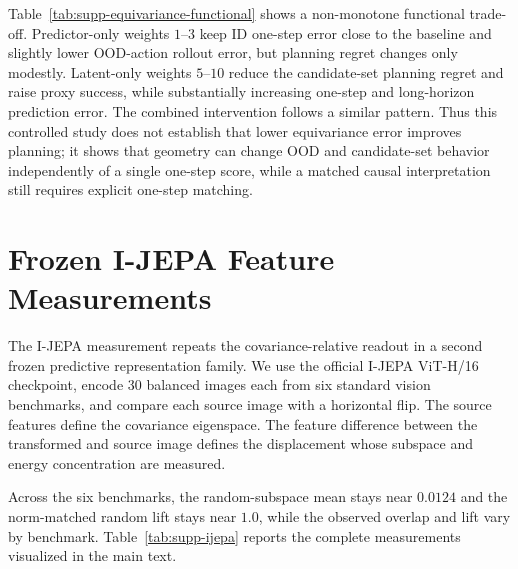 \documentclass{article}
\begin{document}
Table~\ref{tab:supp-equivariance-functional} shows a non-monotone functional
trade-off. Predictor-only weights $1$--$3$ keep ID one-step error close to the
baseline and slightly lower OOD-action rollout error, but planning regret
changes only modestly. Latent-only weights $5$--$10$ reduce the candidate-set
planning regret and raise proxy success, while substantially increasing
one-step and long-horizon prediction error. The combined intervention follows
a similar pattern. Thus this controlled study does not establish that lower
equivariance error improves planning; it shows that geometry can change OOD
and candidate-set behavior independently of a single one-step score, while a
matched causal interpretation still requires explicit one-step matching.

\section{Frozen I-JEPA Feature Measurements}
\label{sec:supp-ijepa}

The I-JEPA measurement repeats the covariance-relative readout in a second frozen predictive representation family. We use the official I-JEPA ViT-H/16 checkpoint, encode 30 balanced images each from six standard vision benchmarks, and compare each source image with a horizontal flip. The source features define the covariance eigenspace. The feature difference between the transformed and source image defines the displacement whose subspace and energy concentration are measured.

Across the six benchmarks, the random-subspace mean stays near $0.0124$ and the norm-matched random lift stays near $1.0$, while the observed overlap and lift vary by benchmark. Table~\ref{tab:supp-ijepa} reports the complete measurements visualized in the main text.
\end{document}
